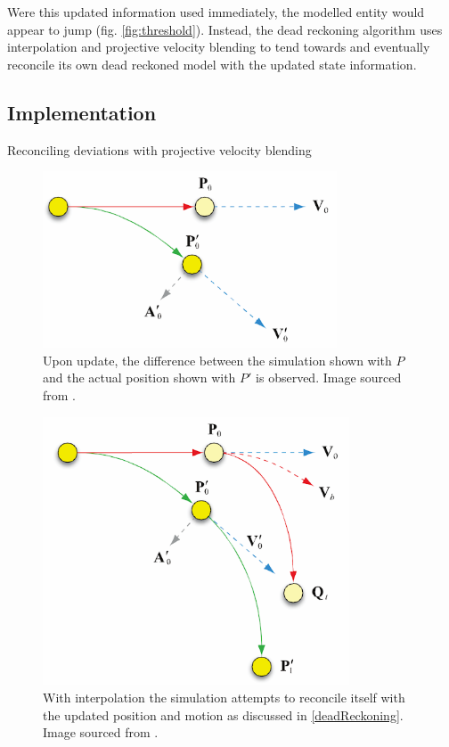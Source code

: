\documentclass[journal]{IEEEtran}
\begin{document}
Were this updated information used immediately, the modelled entity would appear to jump (fig. \ref{fig:threshold}). Instead, the dead reckoning algorithm uses interpolation and projective velocity blending \cite{murphy2011believable} to tend towards and eventually reconcile its own dead reckoned model with the updated state information.

\subsection{Implementation} \label{implementation}

Reconciling deviations with projective velocity blending

\begin{figure}[h]
    \centering
    \includegraphics[width=0.7\linewidth]{DR2.png}
    \caption{Upon update, the difference between the simulation shown with $P$ and the actual position shown with $P'$ is observed. Image sourced from \cite{murphy2011believable}.}
    \label{fig:dr2}
\end{figure}

\begin{figure}[h]
    \centering
    \includegraphics[width=0.7\linewidth]{DR3.png}
    \caption{With interpolation the simulation attempts to reconcile itself with the updated position and motion as discussed in \ref{deadReckoning}. Image sourced from \cite{murphy2011believable}.}
    \label{fig:dr3}
\end{figure}
\end{document}
